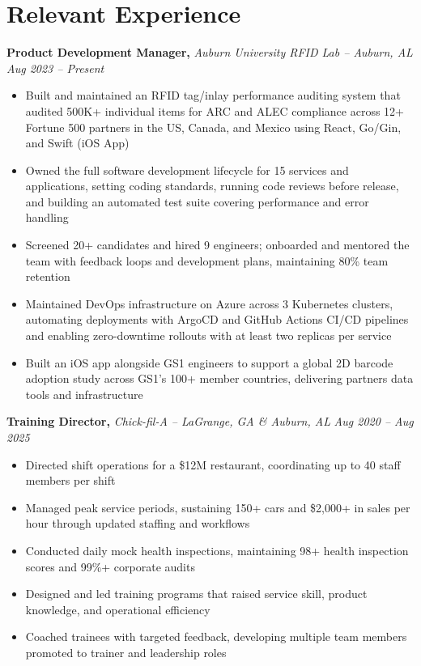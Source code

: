 \documentclass[10pt]{article}       %
\begin{document}
\section*{Relevant Experience}
\textbf{Product Development Manager,} \textit{Auburn University RFID Lab -- Auburn, AL} \hfill \textit{Aug 2023 -- Present} \\
\begin{itemize}
  \item Built and maintained an RFID tag/inlay performance auditing system that audited 500K+ individual items for ARC and ALEC compliance across 12+ Fortune 500 partners in the US, Canada, and Mexico using React, Go/Gin, and Swift (iOS App)
  \item Owned the full software development lifecycle for 15 services and applications, setting coding standards, running code reviews before release, and building an automated test suite covering performance and error handling
  \item Screened 20+ candidates and hired 9 engineers; onboarded and mentored the team with feedback loops and development plans, maintaining 80\% team retention
  \item Maintained DevOps infrastructure on Azure across 3 Kubernetes clusters, automating deployments with ArgoCD and GitHub Actions CI/CD pipelines and enabling zero-downtime rollouts with at least two replicas per service
  \item Built an iOS app alongside GS1 engineers to support a global 2D barcode adoption study across GS1's 100+ member countries, delivering partners data tools and infrastructure
\end{itemize}
\vspace{3pt}

\textbf{Training Director,} \textit{Chick-fil-A -- LaGrange, GA \& Auburn, AL} \hfill \textit{Aug 2020 -- Aug 2025} \\
\begin{itemize}
  \item Directed shift operations for a \$12M restaurant, coordinating up to 40 staff members per shift
  \item Managed peak service periods, sustaining 150+ cars and \$2,000+ in sales per hour through updated staffing and workflows
  \item Conducted daily mock health inspections, maintaining 98+ health inspection scores and 99\%+ corporate audits
  \item Designed and led training programs that raised service skill, product knowledge, and operational efficiency
  \item Coached trainees with targeted feedback, developing multiple team members promoted to trainer and leadership roles
\end{itemize}
\end{document}
